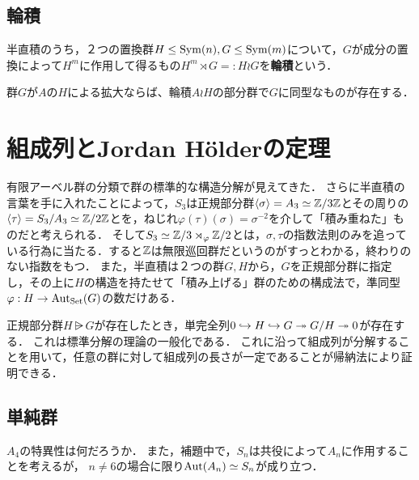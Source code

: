 \documentclass[uplatex,dvipdfmx]{jsreport}
\begin{document}
\subsection{輪積}

\begin{definition}
    半直積のうち，２つの置換群$H\le\mathrm{Sym}(n),G\le\mathrm{Sym}(m)$について，$G$が成分の置換によって$H^m$に作用して得るもの$H^m\rtimes G=:H\wr G$を\textbf{輪積}という．
\end{definition}

\begin{theorem}[普遍埋め込み定理]
    群$G$が$A$の$H$による拡大ならば、輪積$ A \wr H $の部分群で$G$に同型なものが存在する．
\end{theorem}

\section{組成列とJordan Hölderの定理}

\begin{tcolorbox}[colframe=ForestGreen, colback=ForestGreen!10!white,breakable,colbacktitle=ForestGreen!40!white,coltitle=black,fonttitle=\bfseries\sffamily,
title=]
    有限アーベル群の分類で群の標準的な構造分解が見えてきた．
    さらに半直積の言葉を手に入れたことによって，$S_3$は正規部分群$\langle\sigma\rangle=A_3\simeq\mathbb{Z}/3\mathbb{Z}$とその周りの$\langle\tau\rangle=S_3/A_3\simeq\mathbb{Z}/2\mathbb{Z}$とを，ねじれ$\varphi(\tau)(\sigma)=\sigma^{-2}$を介して「積み重ねた」ものだと考えられる．
    そして$S_3\simeq\mathbb{Z}/3\rtimes_\varphi\mathbb{Z}/2$とは，$\sigma,\tau$の指数法則のみを追っている行為に当たる．すると$\mathbb{Z}$は無限巡回群だというのがすっとわかる，終わりのない指数をもつ．
    また，半直積は２つの群$G,H$から，$G$を正規部分群に指定し，その上に$H$の構造を持たせて「積み上げる」群のための構成法で，準同型$\varphi:H\to\mathrm{Aut}_{\mathrm{Set}}(G)$の数だけある．

    正規部分群$H\rsub G$が存在したとき，単完全列$0\hookrightarrow H\hookrightarrow G\twoheadrightarrow G/H\twoheadrightarrow 0$が存在する．
    これは標準分解の理論の一般化である．
    これに沿って組成列が分解することを用いて，任意の群に対して組成列の長さが一定であることが帰納法により証明できる．
\end{tcolorbox}

\subsection{単純群}

\begin{tcolorbox}[colframe=ForestGreen, colback=ForestGreen!10!white,breakable,colbacktitle=ForestGreen!40!white,coltitle=black,fonttitle=\bfseries\sffamily,
title=群自体が一つの共役類（軌道）からなる群]
    $A_4$の特異性は何だろうか．
    また，補題中で，$S_n$は共役によって$A_n$に作用することを考えるが，
    $n\ne 6$の場合に限り$\mathrm{Aut}(A_n)\simeq S_n$が成り立つ．
\end{tcolorbox}
\end{document}
